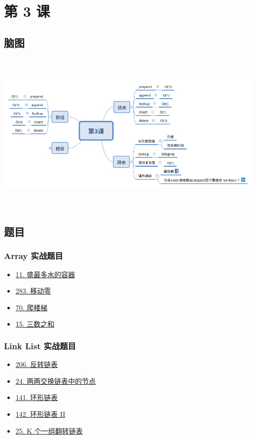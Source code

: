 \newpage
\section{第 3 课}

\subsection{脑图}

\includegraphics[width=170mm,height=80mm]{images/第3课.png}

\subsection{题目}

\subsubsection{Array 实战题目}

\begin{itemize}
  \item \hyperref[leetcode:11]{11. 盛最多水的容器}
  \item \hyperref[leetcode:283]{283. 移动零}
  \item \hyperref[leetcode:70]{70. 爬楼梯}
  \item \hyperref[leetcode:15]{15. 三数之和}
\end{itemize}

\subsubsection{Link List 实战题目}

\begin{itemize}
  \item \hyperref[leetcode:206]{206. 反转链表}
  \item \hyperref[leetcode:24]{24. 两两交换链表中的节点}
  \item \hyperref[leetcode:141]{141. 环形链表}
  \item \hyperref[leetcode:142]{142. 环形链表 II}
  \item \hyperref[leetcode:25]{25. K 个一组翻转链表}
\end{itemize}

